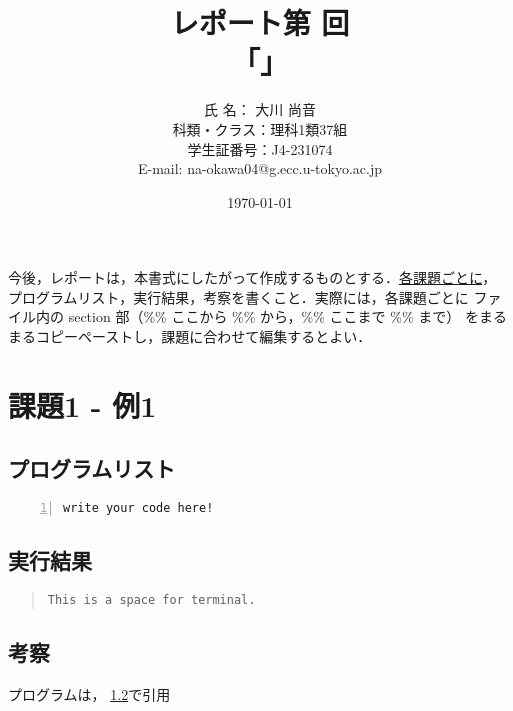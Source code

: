 \documentclass[fontsize=11pt, jafontsize=11pt, paper=a4paper, dvipdfmx]{jlreq}
\title{レポート第  回 \\
  「」}
\author{氏 名：  大川 尚音 \\
        科類・クラス：理科1類37組 \\
        学生証番号：J4-231074 \\
        E-mail: na-okawa04@g.ecc.u-tokyo.ac.jp}
\date{\today}
\begin{document}
\maketitle
%
今後，レポートは，本書式にしたがって作成するものとする．\underline{各課題ごとに}，
プログラムリスト，実行結果，考察を書くこと．実際には，各課題ごとに
ファイル内の section 部（\%\% ここから \%\% から，\%\% ここまで \%\% まで）
をまるまるコピーペーストし，課題に合わせて編集するとよい．


\section{課題1 - 例1}
\subsection{プログラムリスト}
\label{sec:prog-list1}

\begin{lstlisting}[numbers=left,numberstyle=\ttfamily,xleftmargin=2zw]
write your code here!
\end{lstlisting}

%
\subsection{実行結果}
\label{sec:results1}

\begin{quote}           %
\begin{verbatim}
This is a space for terminal.
\end{verbatim}
\end{quote}
%
\subsection{考察}
プログラムは，
\ref{sec:results1}で引用

\end{document}
